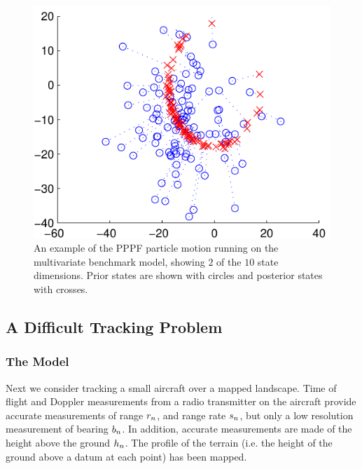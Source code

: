 \documentclass{article}
\begin{document}
\begin{figure}
\centering
\includegraphics[width=0.7\columnwidth]{nlng_example_frame_deter.pdf}
\caption{An example of the PPPF particle motion running on the multivariate benchmark model, showing $2$ of the $10$ state dimensions. Prior states are shown with circles and posterior states with crosses.}
\label{fig:nlng_example_frame}
\end{figure}



\subsection{A Difficult Tracking Problem} \label{sec:numsim:tracking}

\subsubsection{The Model}

Next we consider tracking a small aircraft over a mapped landscape. Time of flight and Doppler measurements from a radio transmitter on the aircraft provide accurate measurements of range $r_{n}$, and range rate $s_{n}$, but only a low resolution measurement of bearing $b_{n}$. In addition, accurate measurements are made of the height above the ground $h_{n}$. The profile of the terrain (i.e. the height of the ground above a datum at each point) has been mapped.
\end{document}
